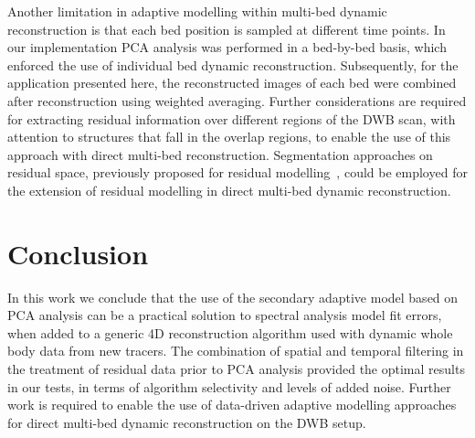 Another limitation in adaptive modelling within multi-bed dynamic reconstruction is that each bed position is sampled at different time points. In our implementation PCA analysis was performed in a bed-by-bed basis, which enforced the use of individual bed dynamic reconstruction. Subsequently, for the application presented here, the reconstructed images of each bed were combined after reconstruction using weighted averaging. Further considerations are required for extracting residual information over different regions of the DWB scan, with attention to structures that fall in the overlap regions, to enable the use of this approach with direct multi-bed reconstruction. Segmentation approaches on residual space, previously proposed for residual modelling~\cite{Germino2016}, could be employed for the extension of residual modelling in direct multi-bed dynamic reconstruction.

\section{Conclusion}
In this work we conclude that the use of the secondary adaptive model based on PCA analysis can be a practical solution to spectral analysis model fit errors, when added to a generic 4D reconstruction algorithm used with dynamic whole body data from new tracers. The combination of spatial and temporal filtering in the treatment of residual data prior to PCA analysis provided the optimal results in our tests, in terms of algorithm selectivity and levels of added noise. 
Further work is required to enable the use of data-driven adaptive modelling approaches for direct multi-bed dynamic reconstruction on the DWB setup. 